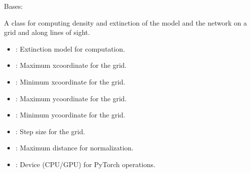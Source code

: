 \documentclass[letterpaper,10pt,english]{sphinxmanual}
\begin{document}
\begin{fulllineitems}
\label{\detokenize{Calculator:Calculator.Calculator}}
\pysigstartsignatures
{}
\pysigstopsignatures
\sphinxAtStartPar
Bases: 

\sphinxAtStartPar
A class for computing density and extinction of the model and the network on a grid and along lines of sight.
\begin{description}
\begin{itemize}
\item {} 
\sphinxAtStartPar
{}: Extinction model for computation.

\item {} 
\sphinxAtStartPar
{}: Maximum x\sphinxhyphen{}coordinate for the grid.

\item {} 
\sphinxAtStartPar
{}: Minimum x\sphinxhyphen{}coordinate for the grid.

\item {} 
\sphinxAtStartPar
{}: Maximum y\sphinxhyphen{}coordinate for the grid.

\item {} 
\sphinxAtStartPar
{}: Minimum y\sphinxhyphen{}coordinate for the grid.

\item {} 
\sphinxAtStartPar
{}: Step size for the grid.

\item {} 
\sphinxAtStartPar
{}: Maximum distance for normalization.

\item {} 
\sphinxAtStartPar
{}: Device (CPU/GPU) for PyTorch operations.


\end{itemize}
\end{description}
\end{fulllineitems}
\end{document}
